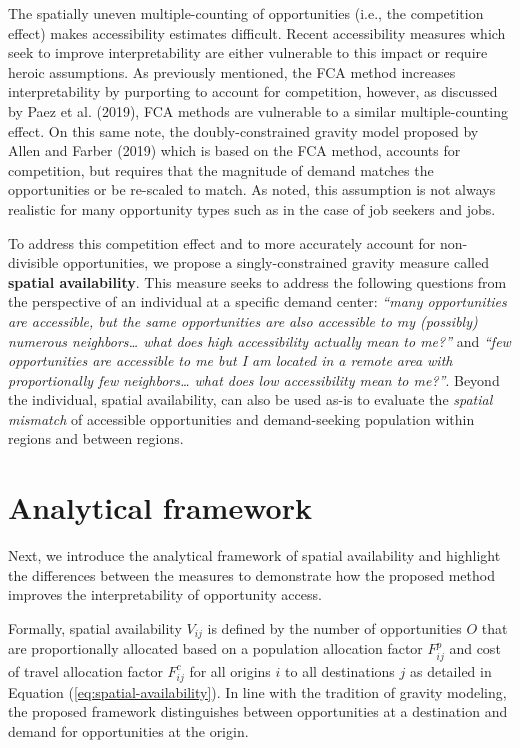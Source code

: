 \documentclass[]{elsarticle} %
\begin{document}
The spatially uneven multiple-counting of opportunities (i.e., the
competition effect) makes accessibility estimates difficult. Recent
accessibility measures which seek to improve interpretability are either
vulnerable to this impact or require heroic assumptions. As previously
mentioned, the FCA method increases interpretability by purporting to
account for competition, however, as discussed by Paez et al. (2019),
FCA methods are vulnerable to a similar multiple-counting effect. On
this same note, the doubly-constrained gravity model proposed by Allen
and Farber (2019) which is based on the FCA method, accounts for
competition, but requires that the magnitude of demand matches the
opportunities or be re-scaled to match. As noted, this assumption is not
always realistic for many opportunity types such as in the case of job
seekers and jobs.

To address this competition effect and to more accurately account for
non-divisible opportunities, we propose a singly-constrained gravity
measure called \textbf{spatial availability}. This measure seeks to
address the following questions from the perspective of an individual at
a specific demand center: \emph{``many opportunities are accessible, but
the same opportunities are also accessible to my (possibly) numerous
neighbors\ldots{} what does high accessibility actually mean to me?''}
and \emph{``few opportunities are accessible to me but I am located in a
remote area with proportionally few neighbors\ldots{} what does low
accessibility mean to me?''}. Beyond the individual, spatial
availability, can also be used as-is to evaluate the \emph{spatial
mismatch} of accessible opportunities and demand-seeking population
within regions and between regions.

\hypertarget{analytical-framework}{%
\section{Analytical framework}\label{analytical-framework}}

Next, we introduce the analytical framework of spatial availability and
highlight the differences between the measures to demonstrate how the
proposed method improves the interpretability of opportunity access.

Formally, spatial availability \(V_{ij}\) is defined by the number of
opportunities \(O\) that are proportionally allocated based on a
population allocation factor \(F^p_{ij}\) and cost of travel allocation
factor \(F^c_{ij}\) for all origins \(i\) to all destinations \(j\) as
detailed in Equation (\ref{eq:spatial-availability}). In line with the
tradition of gravity modeling, the proposed framework distinguishes
between opportunities at a destination and demand for opportunities at
the origin.
\end{document}
